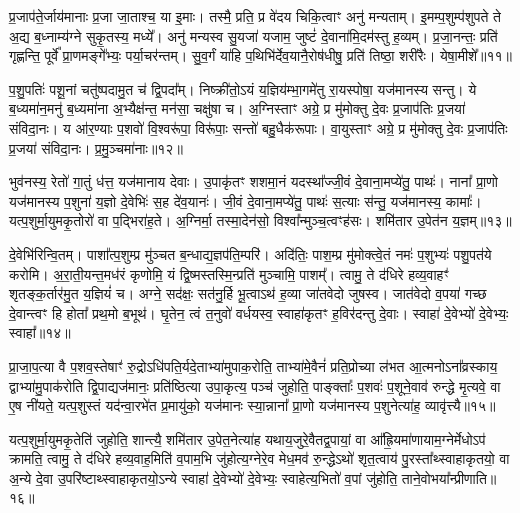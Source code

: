 प्र॒जाप॑ते॒र्जाय॑मानाः प्र॒जा जा॒ताश्च॒ या इ॒माः। तस्मै॒ प्रति॒ प्र वे॑दय चिकि॒त्वाꣳ अनु॑ मन्यताम्। इ॒मम्प॒शुम्प॑शुपते ते अ॒द्य ब॒ध्नाम्य॑ग्ने सुकृ॒तस्य॒ मध्ये᳚। अनु॑ मन्यस्व सु॒यजा॑ यजाम॒ जुष्टं॑ दे॒वाना॑मि॒दम॑स्तु ह॒व्यम्। प्र॒जा॒नन्तः॒ प्रति॑ गृह्णन्ति॒ पूर्वे᳚ प्रा॒णमङ्गे᳚भ्यः॒ पर्या॒चर॑न्तम्। सु॒व॒र्गं या॑हि प॒थिभि॑र्देव॒यानै॒रोष॑धीषु॒ प्रति॑ तिष्ठा॒ शरी॑रैः। येषा॒मीशे᳚॥११॥

प॒शु॒पतिः॑ पशू॒नां चतु॑ष्पदामु॒त च॑ द्वि॒पदा᳚म्। निष्क्री॑तो॒\-ऽयं य॒ज्ञिय॑म्भा॒गमे॑तु रा॒यस्पोषा॒ यज॑मानस्य सन्तु। ये ब॒ध्यमा॑न॒मनु॑ ब॒ध्यमा॑ना अ॒भ्यैक्ष॑न्त॒ मन॑सा॒ चक्षु॑षा च। अ॒ग्निस्ताꣳ अग्रे॒ प्र मु॑मोक्तु दे॒वः प्र॒जाप॑तिः प्र॒जया॑ संविदा॒नः। य आ॑र॒ण्याः प॒शवो॑ वि॒श्वरू॑पा॒ विरू॑पाः॒ सन्तो॑ बहु॒धैक॑रूपाः। वा॒युस्ताꣳ अग्रे॒ प्र मु॑मोक्तु दे॒वः प्र॒जाप॑तिः प्र॒जया॑ संविदा॒नः। प्र॒मु॒ञ्चमा॑नाः॥१२॥

भुव॑नस्य॒ रेतो॑ गा॒तुं ध॑त्त॒ यज॑मानाय देवाः। उ॒पाकृ॑तꣳ शशमा॒नं यदस्था᳚ज्जी॒वं दे॒वाना॒मप्ये॑तु॒ पाथः॑। नाना᳚ प्रा॒णो यज॑मानस्य प॒शुना॑ य॒ज्ञो दे॒वेभिः॑ स॒ह दे॑व॒यानः॑। जी॒वं दे॒वाना॒मप्ये॑तु॒ पाथः॑ स॒त्याः स॑न्तु॒ यज॑मानस्य॒ कामाः᳚। यत्प॒शुर्मा॒युमकृ॒तोरो॑ वा प॒द्भिरा॑ह॒ते। अ॒ग्निर्मा॒ तस्मा॒देन॑सो॒ विश्वा᳚न्मुञ्च॒त्वꣳह॑सः। शमि॑तार उ॒पेत॑न य॒ज्ञम्॥१३॥

दे॒वेभि॑रिन्वि॒तम्। पाशा᳚त्प॒शुम्प्र मु॑ञ्चत ब॒न्धाद्य॒ज्ञप॑ति॒म्परि॑। अदि॑तिः॒ पाश॒म्प्र मु॑मोक्त्वे॒तं नमः॑ प॒शुभ्यः॑ पशु॒पत॑ये करोमि। अ॒रा॒ती॒यन्त॒मध॑रं कृणोमि॒ यं द्वि॒ष्मस्तस्मि॒न्प्रति॑ मुञ्चामि॒ पाशम्᳚। त्वामु॒ ते द॑धिरे हव्य॒वाहꣳ॑ शृतङ्क॒र्तार॑मु॒त य॒ज्ञियं॑ च। अग्ने॒ सद॑क्षः॒ सत॑नु॒र्\mbox{}हि भू॒त्वा\-ऽथ॑ ह॒व्या जा॑तवेदो जुषस्व। जात॑वेदो व॒पया॑ गच्छ दे॒वान्त्वꣳ हि होता᳚ प्रथ॒मो ब॒भूथ॑। घृ॒तेन॒ त्वं त॒नुवो॑ वर्धयस्व॒ स्वाहा॑कृतꣳ ह॒विर॑दन्तु दे॒वाः। स्वाहा॑ दे॒वेभ्यो॑ दे॒वेभ्यः॒ स्वाहा᳚॥१४॥

{\anuvakamend[{ईशे᳚ प्रमु॒ञ्चमा॑ना य॒ज्ञन्त्वꣳ षोड॑श च॥४॥}]}

प्रा॒जा॒प॒त्या वै प॒शव॒स्तेषाꣳ॑ रु॒द्रो\-ऽधि॑पति॒र्यदे॒ताभ्या॑मुपाक॒रोति॒ ताभ्या॑मे॒वैनं॑ प्रति॒प्रोच्या ल॑भत आ॒त्मनो\-ऽना᳚व्रस्काय॒ द्वाभ्या॑मु॒पाक॑रोति द्वि॒पाद्यज॑मानः॒ प्रति॑ष्ठित्या उपा॒कृत्य॒ पञ्च॑ जुहोति॒ पाङ्क्ताः᳚ प॒शवः॑ प॒शूने॒वाव॑ रुन्द्धे मृ॒त्यवे॒ वा ए॒ष नी॑यते॒ यत्प॒शुस्तं यद॑न्वा॒रभे॑त प्र॒मायु॑को॒ यज॑मानः स्या॒न्नाना᳚ प्रा॒णो यज॑मानस्य प॒शुनेत्या॑ह॒ व्यावृ॑त्त्यै॥१५॥

यत्प॒शुर्मा॒युमकृ॒तेति॑ जुहोति॒ शान्त्यै॒ शमि॑तार उ॒पेत॒नेत्या॑ह यथाय॒जुरे॒वैतद्व॒पायां॒ वा आ᳚ह्रि॒यमा॑णायाम॒ग्नेर्मेधो\-ऽप॑ क्रामति॒ त्वामु॒ ते द॑धिरे हव्य॒वाह॒मिति॑ व॒पाम॒भि जु॑होत्य॒ग्नेरे॒व मेध॒मव॑ रु॒न्द्धे\-ऽथो॑ शृत॒त्वाय॑ पु॒रस्ता᳚थ्स्वाहाकृतयो॒ वा अ॒न्ये दे॒वा उ॒परि॑ष्टाथ्स्वाहाकृतयो॒\-ऽन्ये स्वाहा॑ दे॒वेभ्यो॑ दे॒वेभ्यः॒ स्वाहेत्य॒भितो॑ व॒पां जु॑होति॒ ताने॒वोभया᳚न्प्रीणाति॥१६॥

